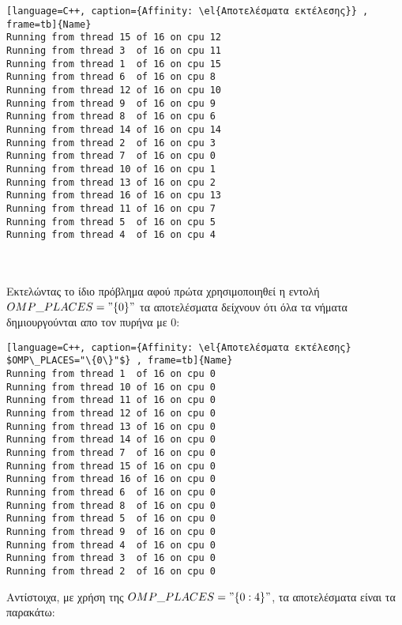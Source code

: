 \clearpage
{}
\begin{spacing}{1.0}
\begin{lstlisting}[language=C++, caption={Affinity: \el{Αποτελέσματα εκτέλεσης}} , frame=tb]{Name}
Running from thread 15 of 16 on cpu 12
Running from thread 3  of 16 on cpu 11
Running from thread 1  of 16 on cpu 15
Running from thread 6  of 16 on cpu 8
Running from thread 12 of 16 on cpu 10
Running from thread 9  of 16 on cpu 9
Running from thread 8  of 16 on cpu 6
Running from thread 14 of 16 on cpu 14
Running from thread 2  of 16 on cpu 3
Running from thread 7  of 16 on cpu 0
Running from thread 10 of 16 on cpu 1
Running from thread 13 of 16 on cpu 2
Running from thread 16 of 16 on cpu 13
Running from thread 11 of 16 on cpu 7
Running from thread 5  of 16 on cpu 5
Running from thread 4  of 16 on cpu 4

\end{lstlisting}
\end{spacing}
\ \\
\ \\
Εκτελώντας το ίδιο πρόβλημα αφού πρώτα χρησιμοποιηθεί η εντολή $OMP\_PLACES="\{0\}"$ τα αποτελέσματα δείχνουν ότι όλα τα νήματα δημιουργούνται απο τον πυρήνα με  0:

\begin{spacing}{1.0}
\begin{lstlisting}[language=C++, caption={Affinity: \el{Αποτελέσματα εκτέλεσης} $OMP\_PLACES="\{0\}"$} , frame=tb]{Name}
Running from thread 1  of 16 on cpu 0
Running from thread 10 of 16 on cpu 0
Running from thread 11 of 16 on cpu 0
Running from thread 12 of 16 on cpu 0
Running from thread 13 of 16 on cpu 0
Running from thread 14 of 16 on cpu 0
Running from thread 7  of 16 on cpu 0
Running from thread 15 of 16 on cpu 0
Running from thread 16 of 16 on cpu 0
Running from thread 6  of 16 on cpu 0
Running from thread 8  of 16 on cpu 0
Running from thread 5  of 16 on cpu 0
Running from thread 9  of 16 on cpu 0
Running from thread 4  of 16 on cpu 0
Running from thread 3  of 16 on cpu 0
Running from thread 2  of 16 on cpu 0

\end{lstlisting}
\end{spacing}
\clearpage
Αντίστοιχα, με χρήση της $OMP\_PLACES="\{0:4\}"$, τα αποτελέσματα είναι τα παρακάτω:


